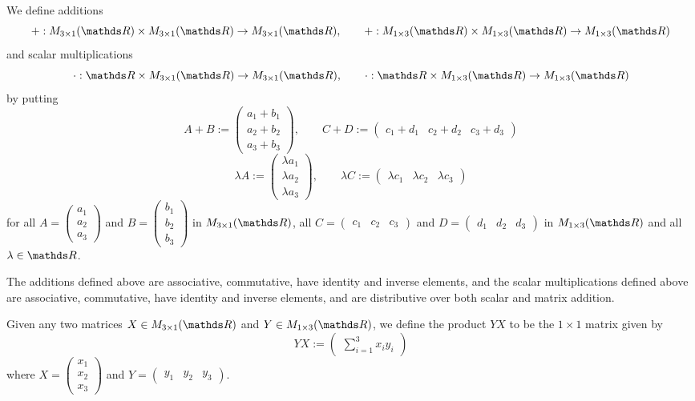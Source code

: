 \begin{df}
	We define additions $$+:M_{3\times 1}(\R)\times M_{3\times 1}(\R)\to M_{3\times 1}(\R),\quad\quad+:M_{1\times 3}(\R)\times M_{1\times 3}(\R)\to M_{1\times 3}(\R)$$ and scalar multiplications
	\[\cdot: \R\times M_{3\times 1}(\R)\to M_{3\times 1}(\R),\quad\quad\cdot: \R\times M_{1\times 3}(\R)\to M_{1\times 3}(\R)\]by putting
	\[A+B:=\begin{pmatrix}
	a_1+b_1\\a_2+b_2\\a_3+b_3
	\end{pmatrix},\quad\quad C+D:=\begin{pmatrix}
	c_1+d_1&c_2+d_2&c_3+d_3
	\end{pmatrix}\]
	\[\lambda A:=\begin{pmatrix}
	\lambda a_1\\\lambda a_2\\\lambda a_3
	\end{pmatrix},\quad\quad\lambda C:=\begin{pmatrix}
	\lambda c_1&\lambda c_2&\lambda c_3
	\end{pmatrix}\]for all $A=\begin{pmatrix}
	a_1\\a_2\\a_3
	\end{pmatrix}$ and $B=\begin{pmatrix}
	b_1\\b_2\\b_3
	\end{pmatrix}$ in $M_{3\times 1}(\R)$, all $C=\begin{pmatrix}
	c_1&c_2&c_3
	\end{pmatrix}$ and $D=\begin{pmatrix}
	d_1&d_2&d_3
	\end{pmatrix}$ in $M_{1\times 3}(\R)$ and all $\lambda\in \R$.
\end{df}

\begin{prop}
	The additions defined above are associative, commutative, have identity and inverse elements, and the scalar multiplications defined above are associative, commutative, have identity and inverse elements, and are distributive over both scalar and matrix addition.
\end{prop}


\begin{df}
	Given any two matrices $X\in M_{3\times 1}(\R)$ and $Y\in M_{1\times 3}(\R)$, we define the product $YX$ to be the $1\times 1$ matrix given by
	\[YX:=\begin{pmatrix}
	\sum_{i=1}^3x_iy_i
	\end{pmatrix}\]where $X=\begin{pmatrix}
	x_1\\x_2\\x_3
	\end{pmatrix}$ and $Y=\begin{pmatrix}
	y_1&y_2&y_3
	\end{pmatrix}$.
\end{df}


